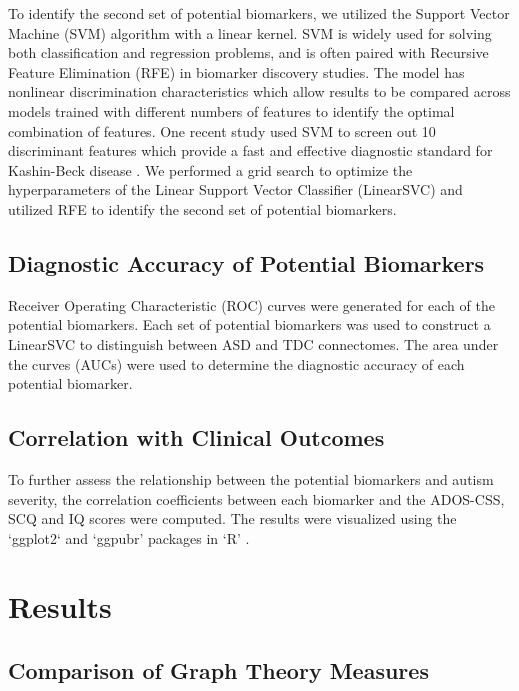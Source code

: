 \documentclass[11pt,conference]{IEEEtran}
\begin{document}
    To identify the second set of potential biomarkers, we utilized the Support Vector 
    Machine (SVM) algorithm with a linear kernel. SVM is widely used for solving both 
    classification and regression problems, and is often paired with Recursive Feature 
    Elimination (RFE) in biomarker discovery studies. The model has nonlinear discrimination 
    characteristics which allow results to be compared across models trained with different 
    numbers of features to identify the optimal combination of features. One recent study 
    used SVM to screen out 10 discriminant features which provide a fast and effective 
    diagnostic standard for Kashin-Beck disease \cite{Zhang.2021}. We performed a grid 
    search to optimize the hyperparameters of the Linear Support Vector Classifier 
    (LinearSVC) and utilized RFE to identify the second set of potential biomarkers.

\subsection*{\textbf{Diagnostic Accuracy of Potential Biomarkers}}
    Receiver Operating Characteristic (ROC) curves were generated for each of the 
    potential biomarkers. Each set of potential biomarkers was used to construct a 
    LinearSVC to distinguish between ASD and TDC connectomes. The area under the 
    curves (AUCs) were used to determine the diagnostic accuracy of each potential 
    biomarker.

\subsection*{\textbf{Correlation with Clinical Outcomes}}
    To further assess the relationship between the potential biomarkers and autism 
    severity, the correlation coefficients between each biomarker and the ADOS-CSS, SCQ 
    and IQ scores were computed. The results were visualized using the `ggplot2` and
    `ggpubr' packages in `R' \cite{ggplot2,R-Core}.


\section{Results}

\subsection*{\textbf{Comparison of Graph Theory Measures}}
\end{document}
